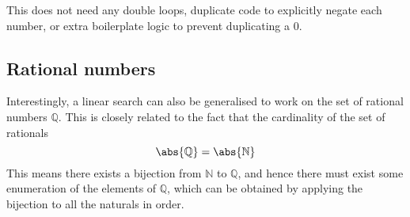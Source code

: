\documentclass[fleqn,a4paper,11pt]{article}
\begin{document}
    This does not need any double loops, duplicate code to explicitly negate
    each number, or extra boilerplate logic to prevent duplicating a 0.

    \subsection{Rational numbers}

    Interestingly, a linear search can also be generalised to work on the set of
    rational numbers $\mathbb{Q}$. This is closely related to the fact that the
    cardinality of the set of rationals
    \begin{equation}
        \abs{\mathbb{Q}} = \abs{\mathbb{N}}
    \end{equation}
    This means there exists a bijection from $\mathbb{N}$ to $\mathbb{Q}$, and
    hence there must exist some enumeration of the elements of $\mathbb{Q}$,
    which can be obtained by applying the bijection to all the naturals in
    order.
\end{document}
